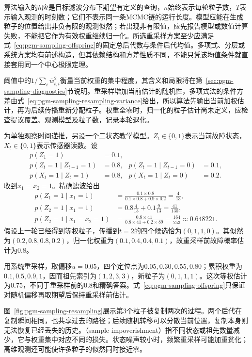 算法输入的$h$应是目标滤波分布下期望有定义的查询，$n$始终表示每轮粒子数，$T$表示输入观测的时刻数；它们不表示同一条MCMC链的运行长度。模型应能在生成粒子的位置给出非负有限的观测似然；若出现非有限值，应先报告模型或数值计算失败，不能把它作为有效权重继续归一化。所选重采样方案至少应满足式~\eqref{eq:pgm-sampling-offspring}的固定总后代数与条件后代均值。多项式、分层或系统方案均有前述构造，但其依赖结构和方差性质不同，不能只凭该均值条件就直接套用同一个中心极限定理。

阈值中的$1/\sum_i\bar w_{t,i}^2$衡量当前权重的集中程度，其含义和局限将在第~\ref{sec:pgm-sampling-diagnostics}节说明。重采样增加当前估计的随机性，多项式法的条件方差由式~\eqref{eq:pgm-sampling-resampling-variance}给出，所以算法先输出当前加权估计，再为后续传播重新分配粒子。权重全零时，归一化的粒子估计尚未定义，应检查提议覆盖、观测模型及粒子数，记录本轮退化。

\begin{example}[二状态设备的粒子滤波]
  \label{ex:pgm-sampling-filter}
  为单独观察时间递推，另设一个二状态教学模型。$Z_t\in\{0,1\}$表示当前故障状态，$X_t\in\{0,1\}$表示传感器读数。设
  \[
    \begin{aligned}
      p(Z_1=1)&=0.1,\\
      p(Z_t=1\mid Z_{t-1}=1)&=0.8,&
      p(Z_t=1\mid Z_{t-1}=0)&=0.1,\\
      p(X_t=1\mid Z_t=1)&=0.8,&
      p(X_t=1\mid Z_t=0)&=0.2.
    \end{aligned}
  \]
  收到$x_1=x_2=1$。精确滤波给出
  \[
    \begin{aligned}
      p(Z_1=1\mid x_1=1)&=\frac{0.1\times0.8}{0.1\times0.8+0.9\times0.2}
        =\frac4{13},\\
      p(Z_2=1\mid x_1=1)&=0.8\frac4{13}+0.1\frac9{13}
        =\frac{41}{130},\\
      p(Z_2=1\mid x_1=x_2=1)&=\frac{0.8\times41}{0.8\times41+0.2\times89}
        =\frac{164}{253}\approx0.648221.
    \end{aligned}
  \]
  假设上一轮已经得到等权粒子，传播到$t=2$的四个候选恰为$(0,1,1,0)$。其似然为$(0.2,0.8,0.8,0.2)$，归一化权重为$(0.1,0.4,0.4,0.1)$，故重采样前故障概率估计为$0.8$。

  用系统重采样，取偏移$u=0.05$，四个定位点为$0.05,0.30,0.55,0.80$；累积权重为$0.1,0.5,0.9,1$，因而祖先索引为$(1,2,3,3)$，新粒子为$(0,1,1,1)$。这次等权估计为$0.75$，不同于重采样前的$0.8$和精确答案。式~\eqref{eq:pgm-sampling-offspring}只保证对随机偏移再取期望后保持重采样前估计。
\end{example}

图~\ref{fig:pgm-sampling-resampling}展示第$3$个粒子被复制两次的过程。两个后代在复制瞬间相同，也共享过去的路径；后续随机转移可以分散当前位置，复制本身则无法恢复已经丢失的历史。（sample impoverishment）指不同状态或祖先数量减少，它与权重集中对应不同的损失。状态噪声较小时，频繁重采样可能加重贫化；高维观测还可能使许多粒子的似然同时接近零。

